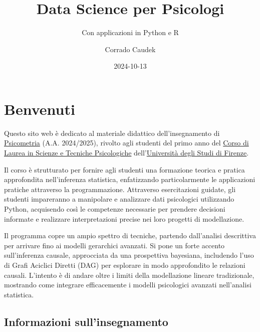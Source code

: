 \documentclass[
  letterpaper,
  krantz2]{{[}./krantz{]}}
\title{Data Science per Psicologi}
\subtitle{Con applicazioni in Python e R}
\author{Corrado Caudek}
\date{2024-10-13}
\begin{document}
\maketitle



\chapter*{Benvenuti}\label{benvenuti}


Questo sito web è dedicato al materiale didattico dell'insegnamento di
\href{https://www.unifi.it/index.php?module=ofform2&mode=1&cmd=3&AA=2023&afId=689762}{Psicometria}
(A.A. 2024/2025), rivolto agli studenti del primo anno del
\href{https://www.psicologia.unifi.it/vp-130-scienze-e-tecniche-psicologiche-l-24.html}{Corso
di Laurea in Scienze e Tecniche Psicologiche}
dell'\href{https://www.unifi.it/}{Università degli Studi di Firenze}.

Il corso è strutturato per fornire agli studenti una formazione teorica
e pratica approfondita nell'inferenza statistica, enfatizzando
particolarmente le applicazioni pratiche attraverso la programmazione.
Attraverso esercitazioni guidate, gli studenti impareranno a manipolare
e analizzare dati psicologici utilizzando Python, acquisendo così le
competenze necessarie per prendere decisioni informate e realizzare
interpretazioni precise nei loro progetti di modellazione.

Il programma copre un ampio spettro di tecniche, partendo dall'analisi
descrittiva per arrivare fino ai modelli gerarchici avanzati. Si pone un
forte accento sull'inferenza causale, approcciata da una prospettiva
bayesiana, includendo l'uso di Grafi Aciclici Diretti (DAG) per
esplorare in modo approfondito le relazioni causali. L'intento è di
andare oltre i limiti della modellazione lineare tradizionale, mostrando
come integrare efficacemente i modelli psicologici avanzati nell'analisi
statistica.

\section*{Informazioni
sull'insegnamento}\label{informazioni-sullinsegnamento}

\end{document}
